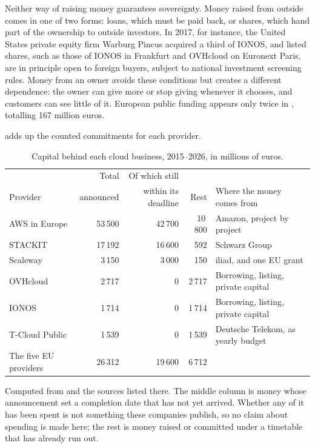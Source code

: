 Neither way of raising money guarantees sovereignty. Money raised from outside
comes in one of two forms: loans, which must be paid back, or shares, which hand
part of the ownership to outside investors. In 2017, for instance, the United States
private equity firm Warburg Pincus acquired a third of IONOS, and listed shares,
such as those of IONOS in Frankfurt and OVHcloud on Euronext Paris, are in
principle open to foreign buyers, subject to national investment screening rules.
Money from an owner avoids these conditions but creates a different dependence:
the owner can give more or stop giving whenever it chooses, and customers can see
little of it. European public funding appears only twice in
, totalling 167 million euros.

 adds up the counted commitments for each provider.

\begin{table}[htbp]
  \centering
  \caption{Capital behind each cloud business, 2015--2026, in millions of euros.}
  \label{tab:study3-investment}
  \footnotesize
  \setlength{\tabcolsep}{5pt}
  \begin{tabular}{@{}l r r r l@{}}
    \toprule
                   & Total    & Of which still & & \\
    Provider       & announced & within its deadline & Rest & Where the money comes from \\
    \midrule
    \acs{AWS} in Europe & 53\,500 & 42\,700 & 10\,800 & Amazon, project by project \\
    STACKIT        & 17\,192 & 16\,600 &    592 & Schwarz Group \\
    Scaleway       &  3\,150 &  3\,000 &    150 & iliad, and one \acs{EU} grant \\
    OVHcloud       &  2\,717 &       0 & 2\,717 & Borrowing, listing, private capital \\
    IONOS          &  1\,714 &       0 & 1\,714 & Borrowing, listing, private capital \\
    T-Cloud Public &  1\,539 &       0 & 1\,539 & Deutsche Telekom, as yearly budget \\
    \midrule
    The five \acs{EU} providers & 26\,312 & 19\,600 & 6\,712 & \\
    \bottomrule
  \end{tabular}

  \vspace{4pt}
  {\footnotesize\raggedright
  Computed from  and the sources listed there. The
  middle column is money whose announcement set a completion date that has not
  yet arrived. Whether any of it has been spent is not something these companies
  publish, so no claim about spending is made here; the rest is money raised or
  committed under a timetable that has already run out.\par}
\end{table}

